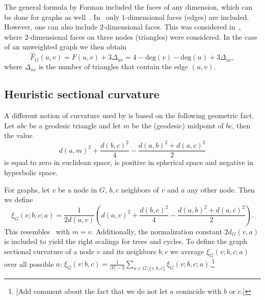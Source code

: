 \documentclass{article} %
\begin{document}
The general formula by Forman included the faces of any dimension, which can be done for graphs as well~\citep{weber2017coarse}. In~ only $1$-dimensional faces (edges) are included. However, one can also include $2$-dimensional faces. This was considered in~\cite{samal2018comparative}, where $2$-dimensional faces on three nodes (triangles) were considered. In the case of an unweighted graph we then obtain
\begin{equation}\label{eq:def_forman_curvature_triangles}
	\hat F_G(u,v) = F(u,v) + 3\Delta_{uv} 
	= 4 - \mathrm{deg}(v) - \mathrm{deg}(u) + 3\Delta_{uv},
\end{equation}
where $\Delta_{uv}$ is the number of triangles that contain the edge $(u,v)$. 



\subsection{Heuristic sectional curvature}

A different notion of curvature used by \citep{gu2019learning} is based on the following geometric fact. 
Let $abc$ be a geodesic triangle and let $m$ be the (geodesic) midpoint of $bc$, then the value
\begin{equation}\label{eq:parallelogram_law}
	d(a,m)^2 + \frac{d(b,c)^2}{4} - \frac{d(a,b)^2 + d(a,c)^2}{2}
\end{equation}
is equal to zero in euclidean space, is positive in spherical space and negative in hyperbolic space.

For graphs, let $v$ be a node in $G$, $b,c$ neighbors of $v$ and $a$ any other node. Then we define
\begin{equation}
\xi_G(v;b,c;a) = \frac{1}{2 d(a,v)} \left( 	d(a,v)^2 + \frac{d(b,c)^2}{4} - \frac{d(a,b)^2 + d(a,c)^2}{2} \right).
\end{equation}
This resembles~ with $m = v$. Additionally, the normalization constant $2d_G(v,a)$ is included to yield the right scalings for trees and cycles.
To define the graph sectional curvature of a node $v$ and its neighbors $b,c$ we average $\xi_G(v;b,c;a)$ over all possible $a$: 
$\xi_G(v; b,c) = \frac{1}{|V|-3} \sum_{a \in G\setminus \{v,b,c\}} \xi_G(v;b,c;a)$.\footnote{[Add comment about the fact that we do not let $a$ conincide with $b$ or $c$.]}

\end{document}
